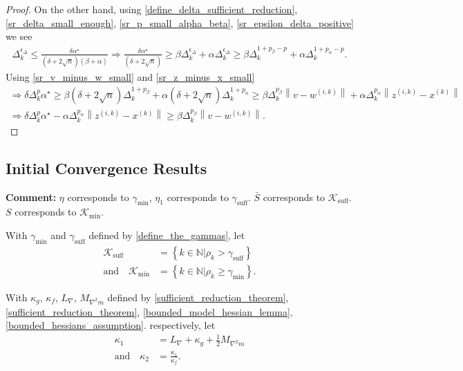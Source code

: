 \documentclass{article}
\newenvironment{comment}
  {\par\medskip
   \color{red}%
   \begin{framed}
   \textbf{Comment: }\ignorespaces}
 {\end{framed}
  \medskip}
\theoremstyle{case}
\numberwithin{theorem}{subsection}
\newcommand{\dk}{\Delta_k}
\newcommand{\gammabi}{\gamma_{\textrm{suff}}}
\newcommand{\gammasm}{\gamma_{\textrm{min}}}
\newcommand{\lipgrad}{{L_{\nabla}}}
\newcommand{\maxmodelhessian}{{M_{\nabla^2 m}}}
\newcommand{\minanglealpha}{{ \alpha^{\star} }}
\newcommand{\naturals}{\mathbb N}
\newcommand{\rk}{\rho_k}
\newcommand{\wik}{{w^{(i, k)}}}
\newcommand{\xk}{x^{(k)}}
\newcommand{\zik}{{z^{(i, k)}}}
\newcommand{\suffiterates}{{\mathcal K_{\textrm{suff}}}}
\newcommand{\miniterates}{{\mathcal K_{\textrm{min}}}}
\newcommand{\theircnot}{{\kappa_1}}
\newcommand{\theirc}{{\kappa_2}}
\begin{document}
\begin{proof}
On the other hand, using \cref{define_delta_sufficient_reduction}, \cref{sr_delta_small_enough}, \cref{sr_p_small_alpha_beta}, \cref{sr_epsilon_delta_positive} we see
\begin{align*}
\dk^{\epsilon_{\Delta}} \le \frac{\delta \minanglealpha}{\left(\delta + 2\sqrt{n}\right) \left(\beta +\alpha\right)} 
\Longrightarrow\frac{ \delta \minanglealpha }{\left(\delta + 2\sqrt{n}\right)} \ge \beta\dk^{\epsilon_{\Delta}} + \alpha\dk^{\epsilon_{\Delta}} 
\ge \beta \dk^{1 + p_{\beta} - p} + \alpha \dk ^{1 + p_{\alpha} - p}.
\end{align*}
Using \cref{sr_v_minus_w_small} and \cref{sr_z_minus_x_small}
\begin{align*}
\Longrightarrow \delta\dk^{p} \minanglealpha  \ge \beta \left(\delta + 2\sqrt{n}\right) \dk^{1 + p_{\beta}} + \alpha\left(\delta + 2\sqrt{n}\right)  \dk ^{1 + p_{\alpha}}
\ge \beta \dk^{p_{\beta}}\left\|v - \wik\right\| + \alpha \dk ^{p_{\alpha}} \left\|\zik - \xk\right\|\\
\Longrightarrow \delta\dk^{p} \minanglealpha - \alpha \dk ^{p_{\alpha}} \left\|\zik - \xk\right\|  \ge \beta \dk^{p_{\beta}}\left\|v - \wik\right\|.
\end{align*}
\color{black}


\end{proof}



\subsection{Initial Convergence Results}
\label{initial_convergence_results}
\begin{comment}
$\eta$ corresponds to $\gammasm$, $\eta_1$ corresponds to $\gammabi$.
$\bar S$ corresponds to $\suffiterates$.
$S$ corresponds to $\miniterates$.
\end{comment}


With 
$\gammasm$ and $\gammabi$
defined by \cref{define_the_gammas},
let
\begin{align}
\suffiterates &= \left\{k \in \naturals | \rk > \gammabi \right\} \label{define_suffiterates} \\
\textrm{and} \quad \miniterates &= \left\{k \in \naturals | \rk \ge \gammasm \right\} \label{define_miniterates}.
\end{align}

With
$\kappa_g$, $\kappa_f$, $\lipgrad$, $\maxmodelhessian$
defined by
\cref{sufficient_reduction_theorem}, \cref{sufficient_reduction_theorem}, \cref{bounded_model_hessian_lemma}, \cref{bounded_hessians_assumption}.
respectively, let
\begin{align}
\theircnot &= \lipgrad + \kappa_{g} + \frac 1 2 \maxmodelhessian \label{define_theircnot} \\
\textrm{and} \quad \theirc &= \frac{\theircnot}{\kappa_f} .  \label{define_theirc}
\end{align}
\end{document}
